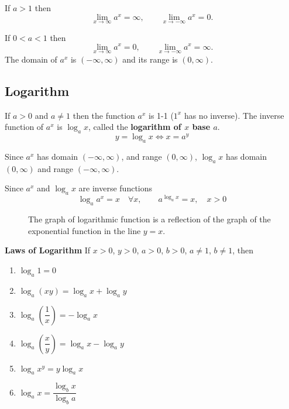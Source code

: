 \documentclass[calc1-main.tex]{subfiles}
\begin{document}
  If $a>1$ then
  \[
    \lim_{x \to \infty} a^x = \infty, \qquad
    \lim_{x \to -\infty} a^x = 0.
  \]

  If $0<a<1$ then
  \[
    \lim_{x \to \infty} a^x = 0, \qquad
    \lim_{x \to -\infty} a^x = \infty.
  \]
  The domain of $a^x$ is $(-\infty, \infty)$ and its range is $(0, \infty)$.
  \begin{figure}[H]
    \centering
    
  \end{figure}

  \subsection*{Logarithm}

  If $a >0$ and $a \neq 1$ then the function $a^x$ is 1-1 ($1^x$ has no inverse). The inverse function of $a^x$ is $\log_a x$, called the \textbf{logarithm of $x$ base $a$}.
  \[
    y = \log_a x \iff x = a^y
  \]

  Since $a^x$ has domain $(-\infty, \infty)$, and range $(0, \infty)$, $\log_a x$ has domain $(0, \infty)$ and range $(-\infty, \infty)$.

  Since $a^x$ and $\log_a x$ are inverse functions
  \[
    \log_a a^x = x \quad \forall x, \qquad a^{\log_a x} = x, \quad x>0
  \]

  \begin{figure}[H]
    \centering
    
    \caption{The graph of logarithmic function is a reflection of the graph of the exponential function in the line $y = x$.}
  \end{figure}

  \textbf{Laws of Logarithm}
  If $x>0$, $y>0$, $a>0$, $b>0$, $a \neq 1$, $b \neq 1$, then

  \begin{multicols}{2}
    \begin{enumerate}
      \item $\log_a 1 = 0$
      \item $\log_a (x y) = \log_a x + \log_a y$
      \item $\log_a (\dfrac{1}{x}) = - \log_a x$
      \item $\log_a (\dfrac{x}{y}) = \log_a x - \log_a y$
      \item $\log_a x^y = y \log_a x$
      \item $\log_a x = \dfrac{\log_b x}{\log_b a}$
    \end{enumerate}
  \end{multicols}
\end{document}
